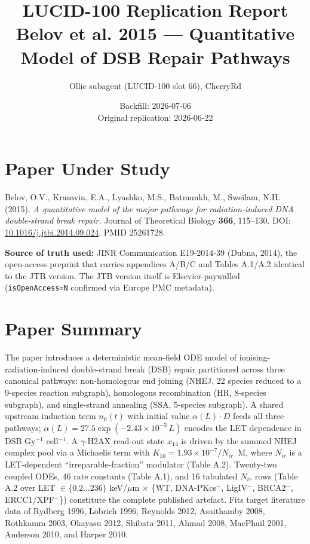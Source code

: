 \documentclass[11pt]{article}
\title{LUCID-100 Replication Report \\
\large Belov et al. 2015 --- Quantitative Model of DSB Repair Pathways}
\author{Ollie subagent (LUCID-100 slot 66), CherryRd}
\date{Backfill: 2026-07-06 \\ Original replication: 2026-06-22}
\begin{document}
\maketitle

\section*{Paper Under Study}

Belov, O.V., Krasavin, E.A., Lyashko, M.S., Batmunkh, M., Sweilam, N.H. (2015).
\emph{A quantitative model of the major pathways for radiation-induced DNA
double-strand break repair.} Journal of Theoretical Biology \textbf{366}, 115--130.
DOI: \href{https://doi.org/10.1016/j.jtbi.2014.09.024}{10.1016/j.jtbi.2014.09.024}.
PMID 25261728.

\textbf{Source of truth used:} JINR Communication E19-2014-39 (Dubna, 2014),
the open-access preprint that carries appendices A/B/C and Tables A.1/A.2
identical to the JTB version. The JTB version itself is Elsevier-paywalled
(\texttt{isOpenAccess=N} confirmed via Europe PMC metadata).

\section*{Paper Summary}

The paper introduces a deterministic mean-field ODE model of ionising-radiation-induced
double-strand break (DSB) repair partitioned across three canonical pathways: non-homologous
end joining (NHEJ, 22 species reduced to a 9-species reaction subgraph),
homologous recombination (HR, 8-species subgraph), and single-strand annealing
(SSA, 5-species subgraph). A shared upstream induction term $n_0(t)$ with initial
value $\alpha(L)\cdot D$ feeds all three pathways; $\alpha(L)=27.5\exp(-2.43\times10^{-3}\,L)$
encodes the LET dependence in DSB Gy$^{-1}$ cell$^{-1}$. A $\gamma$-H2AX read-out state $x_{14}$ is
driven by the summed NHEJ complex pool via a Michaelis term with $K_{10}=1.93\times10^{-7}/N_{ir}$~M,
where $N_{ir}$ is a LET-dependent ``irreparable-fraction'' modulator (Table A.2).
Twenty-two coupled ODEs, 46 rate constants (Table A.1), and 16 tabulated $N_{ir}$ rows
(Table A.2 over LET $\in\{0.2\ldots236\}$ keV/$\mu$m $\times$ \{WT, DNA-PKcs$^-$, LigIV$^-$,
BRCA2$^-$, ERCC1/XPF$^-$\}) constitute the complete published artefact.
Fits target literature data of Rydberg 1996, L\"obrich 1996, Reynolds 2012, Asaithamby 2008,
Rothkamm 2003, Okayasu 2012, Shibata 2011, Ahmad 2008, MacPhail 2001,
Anderson 2010, and Harper 2010.
\end{document}
